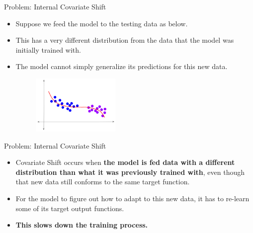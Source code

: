 \documentclass[serif, aspectratio=169]{beamer}
\begin{document}
\begin{frame}{Problem: Internal Covariate Shift}

\begin{itemize}

    \item Suppose we feed the model to the testing data as below.
    \item This has a very different distribution from the data that the model was initially trained with.
    \item The model cannot simply generalize its predictions for this new data.

    \begin{figure}
        \includegraphics[width=0.4\textwidth]{pic/ICS-4.png}
        \label{fig:Rest_data_distribution}
    \end{figure}

    \vfill

\end{itemize}

\end{frame}

\begin{frame}{Problem: Internal Covariate Shift}
    
\begin{itemize}
    \item Covariate Shift occurs when \textbf{the model is fed data with a different distribution than what it was previously trained with}, even though that new data still conforms to the same target function.

    \item For the model to figure out how to adapt to this new data, it has to re-learn some of its target output functions.
    \item \textbf{This slows down the training process.}
    
\end{itemize}

\end{frame}
\end{document}
